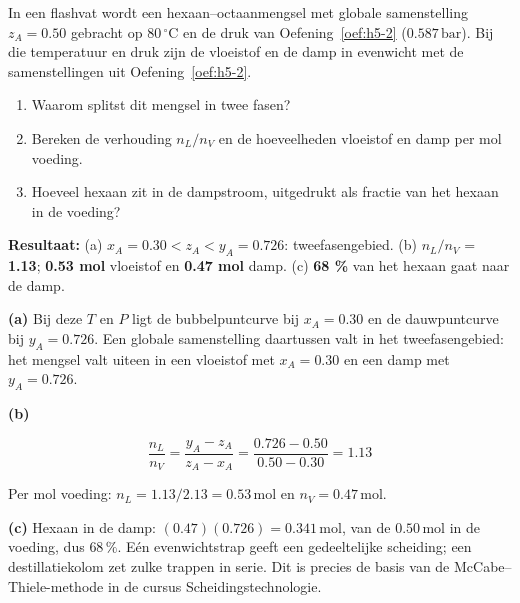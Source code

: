 \begin{oefening}
In een flashvat wordt een hexaan--octaanmengsel met globale samenstelling \(z_A = 0.50\) gebracht op \(80\,^\circ\mathrm{C}\) en de druk van Oefening~\ref{oef:h5-2} (\(0.587\,\mathrm{bar}\)). Bij die temperatuur en druk zijn de vloeistof en de damp in evenwicht met de samenstellingen uit Oefening~\ref{oef:h5-2}.

\begin{enumerate}
\item[(a)]
  Waarom splitst dit mengsel in twee fasen?
\item[(b)]
  Bereken de verhouding \(n_L/n_V\) en de hoeveelheden vloeistof en damp per mol voeding.
\item[(c)]
  Hoeveel hexaan zit in de dampstroom, uitgedrukt als fractie van het hexaan in de voeding?
\end{enumerate}
\end{oefening}
\begin{oplossing}
\textbf{Resultaat:} (a) \(x_A = 0.30 < z_A < y_A = 0.726\): tweefasengebied. (b) \(n_L/n_V\) = \textbf{1.13}; \textbf{0.53 mol} vloeistof en \textbf{0.47 mol} damp. (c) \textbf{68 \%} van het hexaan gaat naar de damp.

\textbf{(a)} Bij deze \(T\) en \(P\) ligt de bubbelpuntcurve bij \(x_A = 0.30\) en de dauwpuntcurve bij \(y_A = 0.726\). Een globale samenstelling daartussen valt in het tweefasengebied: het mengsel valt uiteen in een vloeistof met \(x_A = 0.30\) en een damp met \(y_A = 0.726\).

\textbf{(b)}

\[
\frac{n_L}{n_V} = \frac{y_A - z_A}{z_A - x_A} = \frac{0.726 - 0.50}{0.50 - 0.30} = 1.13
\]

Per mol voeding: \(n_L = 1.13/2.13 = 0.53\,\mathrm{mol}\) en \(n_V = 0.47\,\mathrm{mol}\).

\textbf{(c)} Hexaan in de damp: \((0.47)(0.726) = 0.341\,\mathrm{mol}\), van de \(0.50\,\mathrm{mol}\) in de voeding, dus \(68\,\%\). Eén evenwichtstrap geeft een gedeeltelijke scheiding; een destillatiekolom zet zulke trappen in serie. Dit is precies de basis van de McCabe--Thiele-methode in de cursus Scheidingstechnologie.
\end{oplossing}

